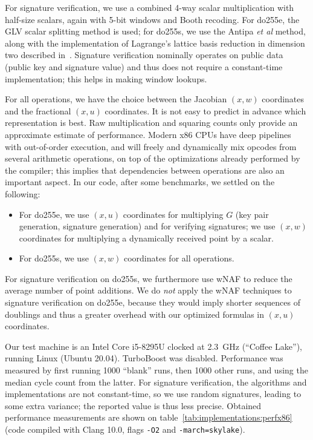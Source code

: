 \documentclass{llncs}
\begin{document}
For signature verification, we use a combined 4-way scalar
multiplication with half-size scalars, again with 5-bit windows and
Booth recoding. For do255e, the GLV scalar splitting method is used; for
do255s, we use the Antipa \emph{et al}
method\cite{AntBroGalLamStrVan2005}, along with the implementation of
Lagrange's lattice basis reduction in dimension two described
in~\cite{Por2020-2}. Signature verification nominally operates on public
data (public key and signature value) and thus does not require a
constant-time implementation; this helps in making window lookups.

For all operations, we have the choice between the Jacobian $(x, w)$
coordinates and the fractional $(x, u)$ coordinates. It is not easy to
predict in advance which representation is best. Raw multiplication and
squaring counts only provide an approximate estimate of performance.
Modern x86 CPUs have deep pipelines with out-of-order execution, and
will freely and dynamically mix opcodes from several arithmetic
operations, on top of the optimizations already performed by the
compiler; this implies that dependencies between operations are also an
important aspect. In our code, after some benchmarks, we settled on the
following:
\begin{itemize}

    \item For do255e, we use $(x, u)$ coordinates for multiplying $G$
    (key pair generation, signature generation) and for verifying
    signatures; we use $(x, w)$ coordinates for multiplying a
    dynamically received point by a scalar.

    \item For do255s, we use $(x, w)$ coordinates for all operations.

\end{itemize}

For signature verification on do255s, we furthermore use wNAF to reduce
the average number of point additions. We do \emph{not} apply the wNAF
techniques to signature verification on do255e, because they would imply
shorter sequences of doublings and thus a greater overhead with our
optimized formulas in $(x, u)$ coordinates.

Our test machine is an Intel Core i5-8295U clocked at 2.3~GHz (``Coffee
Lake''), running Linux (Ubuntu 20.04). TurboBoost was disabled.
Performance was measured by first running 1000 ``blank'' runs, then 1000
other runs, and using the median cycle count from the latter. For
signature verification, the algorithms and implementations are not
constant-time, so we use random signatures, leading to some extra
variance; the reported value is thus less precise. Obtained performance
measurements are shown on table~\ref{tab:implementations:perfx86} (code
compiled with Clang 10.0, flags \verb+-O2+ and \verb+-march=skylake+).
\end{document}
